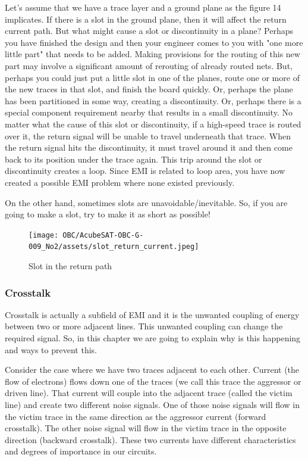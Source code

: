 \documentclass[final]{cubedoc}
\begin{document}
	Let’s assume that we have a trace layer and a ground plane as the figure 14 implicates. If there is a slot in the ground plane, then it will affect the return current path. But what might cause a slot or discontinuity in a plane? Perhaps you have finished the design and then your engineer comes to you with "one more little part" that needs to be added. Making provisions for the routing of this new part may involve a significant amount of rerouting of already routed nets. But, perhaps you could just put a little slot in one of the planes, route one or more of the new traces in that slot, and finish the board quickly. Or, perhaps the plane has been partitioned in some way, creating a discontinuity. Or, perhaps there is a special component requirement nearby that results in a small discontinuity. No matter what the cause of this slot or discontinuity, if a high-speed trace is routed over it, the return signal will be unable to travel underneath that trace. When the return signal hits the discontinuity, it must travel around it and then come back to its position under the trace again. This trip around the slot or discontinuity creates a loop. Since EMI is related to loop area, you have now created a possible EMI problem where none existed previously.  
	
	On the other hand, sometimes slots are unavoidable/inevitable. So, if you are going to make a slot, try to make it as short as possible!
	
	\begin{figure}[h!]
		\centering
		\texttt{[image: OBC/AcubeSAT-OBC-G-009\_No2/assets/slot\_return\_current.jpeg]}
		\caption{Slot in the return path}
		\label{fig:my_label}
	\end{figure}
	
	\subsubsection{Crosstalk}
	
	Crosstalk is actually a subfield of EMI and it is the unwanted coupling of energy between two or more adjacent lines. This unwanted coupling can change the required signal. So, in this chapter we are going to explain why is this happening and ways to prevent this.
	
	Consider the case where we have two traces adjacent to each other. Current (the flow of electrons) flows down one of the traces (we call this trace the aggressor or driven line). That current will couple into the adjacent trace (called the victim line) and create two different noise signals. One of those noise signals will flow in the victim trace in the same direction as the aggressor current (forward crosstalk). The other noise signal will flow in the victim trace in the opposite direction (backward crosstalk). These two currents have different characteristics and degrees of importance in our circuits.
	
\end{document}
